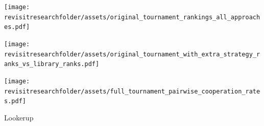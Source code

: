 \documentclass{beamer}
\newcommand{\revisitresearchfolder}{$HOME/rsc/revisiting-axelrod-second}
\newcommand{\mlresearchfolder}{$HOME/rsc/ml-paper}
\begin{document}
    \begin{frame}
        \begin{center}
            \texttt{[image: \\revisitresearchfolder/assets/original\_tournament\_rankings\_all\_approaches.pdf]}
        \end{center}

    \end{frame}

    \begin{frame}
        \begin{center}
            \texttt{[image: \\revisitresearchfolder/assets/original\_tournament\_with\_extra\_strategy\_ranks\_vs\_library\_ranks.pdf]}
        \end{center}

    \end{frame}

    \begin{frame}
        \begin{center}
            \texttt{[image: \\revisitresearchfolder/assets/full\_tournament\_pairwise\_cooperation\_rates.pdf]}
        \end{center}

    \end{frame}

    \begin{frame}
        \begin{center}
            \Large Lookerup

            \vfill
            \normalsize

            \scalebox{.8}{
                
            }
        \end{center}

    \end{frame}
\end{document}
